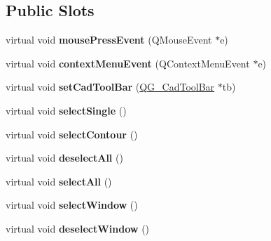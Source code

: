 \subsection*{Public Slots}
\begin{DoxyCompactItemize}
\item 
\hypertarget{classQG__CadToolBarSelect_a7b7741a436c6539b649ce625b05967b0}{virtual void {\bfseries mouse\-Press\-Event} (Q\-Mouse\-Event $\ast$e)}\label{classQG__CadToolBarSelect_a7b7741a436c6539b649ce625b05967b0}

\item 
\hypertarget{classQG__CadToolBarSelect_ad0979ca9413a1eeaa9fb8d1d969a3958}{virtual void {\bfseries context\-Menu\-Event} (Q\-Context\-Menu\-Event $\ast$e)}\label{classQG__CadToolBarSelect_ad0979ca9413a1eeaa9fb8d1d969a3958}

\item 
\hypertarget{classQG__CadToolBarSelect_a6c6589c3ac885c9f45028221e2f21120}{virtual void {\bfseries set\-Cad\-Tool\-Bar} (\hyperlink{classQG__CadToolBar}{Q\-G\-\_\-\-Cad\-Tool\-Bar} $\ast$tb)}\label{classQG__CadToolBarSelect_a6c6589c3ac885c9f45028221e2f21120}

\item 
\hypertarget{classQG__CadToolBarSelect_a416c918f294b05fee376afb55bf81e4e}{virtual void {\bfseries select\-Single} ()}\label{classQG__CadToolBarSelect_a416c918f294b05fee376afb55bf81e4e}

\item 
\hypertarget{classQG__CadToolBarSelect_acd7d7f7ee2f1dfd5967f7c59c786a927}{virtual void {\bfseries select\-Contour} ()}\label{classQG__CadToolBarSelect_acd7d7f7ee2f1dfd5967f7c59c786a927}

\item 
\hypertarget{classQG__CadToolBarSelect_a0080045110657bf7b4ae4f8093e16cc2}{virtual void {\bfseries deselect\-All} ()}\label{classQG__CadToolBarSelect_a0080045110657bf7b4ae4f8093e16cc2}

\item 
\hypertarget{classQG__CadToolBarSelect_a1c6d189db8dc51b406f70908e3cc7506}{virtual void {\bfseries select\-All} ()}\label{classQG__CadToolBarSelect_a1c6d189db8dc51b406f70908e3cc7506}

\item 
\hypertarget{classQG__CadToolBarSelect_a10e69e8aeb2b2d6cfba8bd631fb0bb48}{virtual void {\bfseries select\-Window} ()}\label{classQG__CadToolBarSelect_a10e69e8aeb2b2d6cfba8bd631fb0bb48}

\item 
\hypertarget{classQG__CadToolBarSelect_a2eedcab2eb21e44beb93dc158e24782c}{virtual void {\bfseries deselect\-Window} ()}\label{classQG__CadToolBarSelect_a2eedcab2eb21e44beb93dc158e24782c}


\end{DoxyCompactItemize}
